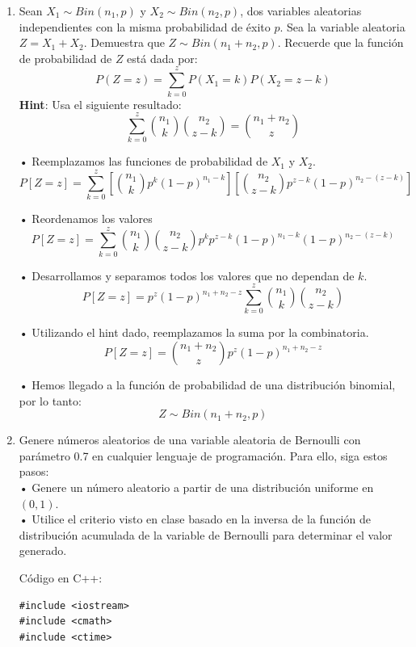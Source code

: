 \documentclass[a4paper, 12pt]{article}
\newcommand{\Pspace}{0.5cm}
\newcommand{\Aspace}{0.2cm}
\begin{document}
\begin{enumerate}
            \newpage
        \item Sean $X_{1} \sim Bin(n_{1}, p)$ y $X_{2} \sim Bin(n_{2}, p)$, dos variables aleatorias independientes con la misma probabilidad de éxito $p$.  
            Sea la variable aleatoria $Z = X_{1} + X_{2}$. Demuestra que $Z \sim Bin(n_{1} + n_{2}, p)$.  
            Recuerde que la función de probabilidad de $Z$ está dada por:
            \[
                P(Z = z) = \sum_{k = 0}^{z} P(X_{1} = k) P(X_{2} = z - k)
            \]
            \textbf{Hint}: Usa el siguiente resultado:
            \[
                \sum_{k = 0}^{z} \binom{n_{1}}{k} \binom{n_{2}}{z - k} = \binom{n_{1} + n_{2}}{z}
            \]
            \vspace{\Aspace} \par
            { \color{azul} 
                • Reemplazamos las funciones de probabilidad de $X_{1}$ y $X_{2}$.
                \[ P[Z = z] = \sum_{k = 0}^{z} \left[ \binom{n_{1}}{k} p^{k} (1 - p)^{n_{1} - k} \right] \left[ \binom{n_{2}}{z - k} p^{z - k} (1 - p)^{n_{2} - (z - k)} \right] \]

                • Reordenamos los valores
                \[ P[Z = z] = \sum_{k = 0}^{z} \binom{n_{1}}{k} \binom{n_{2}}{z - k} p^{k} p^{z - k} (1 - p)^{n_{1} - k} (1 - p)^{n_{2} - (z - k)} \]

                • Desarrollamos y separamos todos los valores que no dependan de $k$.
                \[ P[Z = z] = p^{z} (1 - p)^{n_{1} + n_{2} - z} \sum_{k = 0}^{z} \binom{n_{1}}{k} \binom{n_{2}}{z - k} \]

                • Utilizando el hint dado, reemplazamos la suma por la combinatoria.
                \[ P[Z = z] = \binom{n_{1} + n_{2}}{z} p^{z} (1 - p)^{n_{1} + n_{2} - z} \]

                • Hemos llegado a la función de probabilidad de una distribución binomial, por lo tanto:
                \[ Z \sim Bin(n_{1} + n_{2}, p) \]
            }

    
            \newpage
            \vspace{\Pspace}
        \item Genere números aleatorios de una variable aleatoria de Bernoulli con parámetro 0.7 en cualquier lenguaje de programación. Para ello, siga estos pasos:
            \vspace{0.2cm}
            \\ • Genere un número aleatorio a partir de una distribución uniforme en $(0, 1)$.
            \\ • Utilice el criterio visto en clase basado en la inversa de la función de distribución acumulada de la variable de Bernoulli para determinar el valor generado.
            \vspace{\Aspace} \par
            { \color{azul} 
                \Large Código en C++:
                \begin{lstlisting}
#include <iostream>
#include <cmath>
#include <ctime>


\end{lstlisting}}
\end{enumerate}
\end{document}
